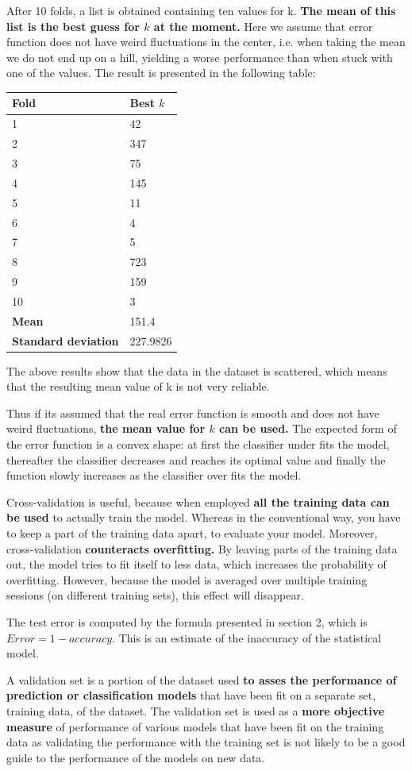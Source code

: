 \documentclass[a4paper]{article}
\begin{document}
After 10 folds, a list is obtained containing ten values for k. \textbf{The mean of this list is the best guess for $k$ at the moment.} Here we assume that error function does not have weird fluctuations in the center, i.e. when taking the mean we do not end up on a hill, yielding a worse performance than when stuck with one of the values. The result is presented in the following table:
\begin{center}
\begin{tabular}{ | l | l | }
\hline
\textbf{Fold} & \textbf{Best $k$}\\
\hline
1 & 42\\
\hline
2 &347\\
\hline
3 & 75\\
\hline
4 & 145\\
\hline
5 & 11\\
\hline
6 & 4\\
\hline
7 & 5\\
\hline
8 & 723\\
\hline
9 & 159\\
\hline
10 & 3\\
\hline
\textbf{Mean} & 151.4\\
\hline
\textbf{Standard deviation} & 227.9826\\
\hline
\end{tabular}
\end{center}
The above results show that the data in the dataset is scattered, which means that the resulting mean value of k is not very reliable.

Thus if its assumed that the real error function is smooth and does not have weird fluctuations, \textbf{the mean value for $k$ can be used.} The expected form of the error function is a convex shape: at first the classifier under fits the model, thereafter the classifier decreases and reaches its optimal value and finally the function slowly increases as the classifier over fits the model.

Cross-validation is useful, because when employed \textbf{all the training data can be used} to actually train the model. Whereas in the conventional way, you have to keep a part of the training data apart, to evaluate your model. Moreover, cross-validation \textbf{counteracts overfitting.} By leaving parts of the training data out, the model tries to fit itself to less data, which increases the probability of overfitting. However, because the model is averaged over multiple training sessions (on different training sets), this effect will disappear.

The test error is computed by the formula presented in section 2, which is $Error = 1 - accuracy$. This is an estimate of the inaccuracy of the statistical model.

A validation set is a portion of the dataset used \textbf{to asses the performance of prediction or classification models} that have been fit on a separate set, training data, of the dataset. The validation set is used as a \textbf{more objective measure} of performance of various models that have been fit on the training data as validating the performance with the training set is not likely to be a good guide to the performance of the models on new data. 
\end{document}
